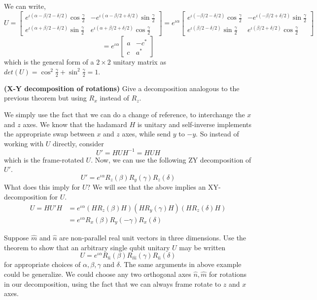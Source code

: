 \begin{example}
    We can write,
    \[
    U=\begin{bmatrix} e^{\iota (\alpha - \beta/2 -\delta/2)} \cos \frac{\gamma}{2} & -e^{\iota (\alpha-\beta/2+\delta/2)}\sin\frac{\gamma}{2}\\
    e^{\iota (\alpha+\beta/2-\delta/2)}\sin\frac{\gamma}{2} & e^{\iota(\alpha+\beta/2+\delta/2)}\cos \frac{\gamma}{2} \end{bmatrix}=e^{\iota \alpha} \begin{bmatrix} e^{\iota (- \beta/2 -\delta/2)} \cos \frac{\gamma}{2} & -e^{\iota (-\beta/2+\delta/2)}\sin\frac{\gamma}{2}\\
    e^{\iota (\beta/2-\delta/2)}\sin\frac{\gamma}{2} & e^{\iota(\beta/2+\delta/2)}\cos \frac{\gamma}{2} \end{bmatrix}
    \]
    \[
    =e^{\iota \alpha}\begin{bmatrix} a & -c^* \\ c & a^* \end{bmatrix}
    \]
    which is the general form of a $2\times 2$ unitary matrix as $det(U)=\cos^2 \frac{\gamma}{2} + \sin^2 \frac{\gamma}{2}=1$.
\end{example}
\begin{example}
    \textbf{(X-Y decomposition of rotations)} Give a decomposition analogous to the previous theorem but using $R_x$ instead of $R_z$.

    
We simply use the fact that we can do a change of reference, to interchange the $x$ and $z$ axes. We know that the hadamard $H$ is unitary and self-inverse implements the appropriate swap between $x$ and $z$ axes, while send $y$ to $-y$. So instead of working with $U$ directly, consider
\[
U'=HUH^{-1 }= HUH
\]
which is the frame-rotated $U$. Now, we can use the following ZY decomposition of $U'$.
\[
U'=e^{\iota \alpha}R_z(\beta)R_y(\gamma)R_z(\delta)
\]
What does this imply for $U$? We will see that the above implies an XY-decomposition for $U$.
\begin{align*}
    U=HU'H&=e^{\iota \alpha}(HR_z(\beta)H)(HR_y(\gamma)H)(HR_z(\delta)H)\\
    &=e^{\iota \alpha} R_x(\beta)R_y(-\gamma)R_x(\delta)
\end{align*}
\end{example}
\begin{example}
    Suppose $\hat{m}$ and $\hat{n}$ are non-parallel real unit vectors in three dimensions. Use the theorem to show that an arbitrary single qubit unitary $U$ may be written
    \[
    U=e^{\iota \alpha} R_{\hat{n}}(\beta)R_{\hat{m}}(\gamma)R_{\hat{n}}(\delta)
    \]
    for appropriate choices of $\alpha,\beta,\gamma$ and $\delta$.
    The same arguments in above example could be generalize. We could choose any two orthogonal axes $\hat{n},\hat{m}$ for rotations in our decomposition, using the fact that we can always frame rotate to $z$ and $x$ axes.
\end{example}

